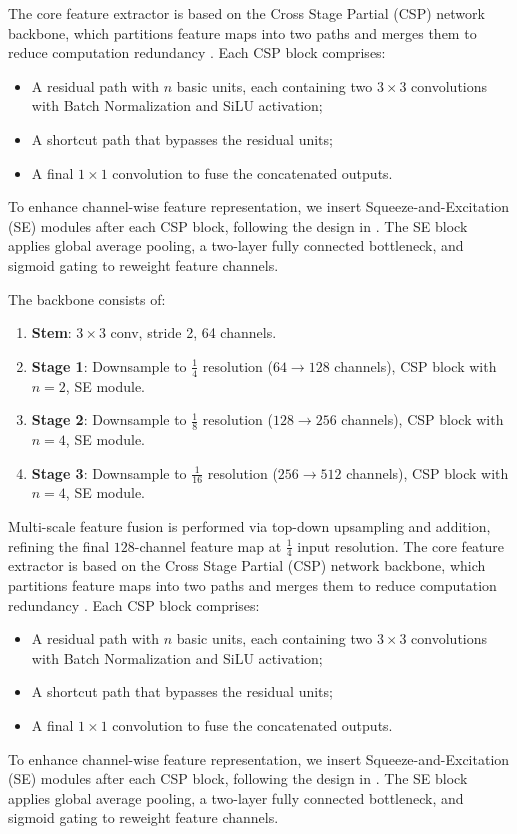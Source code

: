 The core feature extractor is based on the Cross Stage Partial (CSP) network backbone, which partitions feature maps into two paths and merges them to reduce computation redundancy \cite{Wang2020CSPNet}. Each CSP block comprises:
\begin{itemize}
  \item A residual path with $n$ basic units, each containing two $3\times3$ convolutions with Batch Normalization and SiLU activation;
  \item A shortcut path that bypasses the residual units;
  \item A final $1\times1$ convolution to fuse the concatenated outputs.
\end{itemize}
To enhance channel-wise feature representation, we insert Squeeze-and-Excitation (SE) modules after each CSP block, following the design in \cite{Hu2018SENet}. The SE block applies global average pooling, a two-layer fully connected bottleneck, and sigmoid gating to reweight feature channels.

The backbone consists of:
\begin{enumerate}
  \item \textbf{Stem}: $3\times3$ conv, stride 2, 64 channels.
  \item \textbf{Stage 1}: Downsample to $\frac{1}{4}$ resolution ($64\!\to\!128$ channels), CSP block with $n=2$, SE module.
  \item \textbf{Stage 2}: Downsample to $\frac{1}{8}$ resolution ($128\!\to\!256$ channels), CSP block with $n=4$, SE module.
  \item \textbf{Stage 3}: Downsample to $\frac{1}{16}$ resolution ($256\!\to\!512$ channels), CSP block with $n=4$, SE module.
\end{enumerate}
Multi-scale feature fusion is performed via top-down upsampling and addition, refining the final $128$-channel feature map at $\frac{1}{4}$ input resolution.
The core feature extractor is based on the Cross Stage Partial (CSP) network backbone, which partitions feature maps into two paths and merges them to reduce computation redundancy \cite{Wang2020CSPNet}. Each CSP block comprises:
\begin{itemize}
  \item A residual path with $n$ basic units, each containing two $3\times3$ convolutions with Batch Normalization and SiLU activation;
  \item A shortcut path that bypasses the residual units;
  \item A final $1\times1$ convolution to fuse the concatenated outputs.
\end{itemize}
To enhance channel-wise feature representation, we insert Squeeze-and-Excitation (SE) modules after each CSP block, following the design in \cite{Hu2018SENet}. The SE block applies global average pooling, a two-layer fully connected bottleneck, and sigmoid gating to reweight feature channels.

